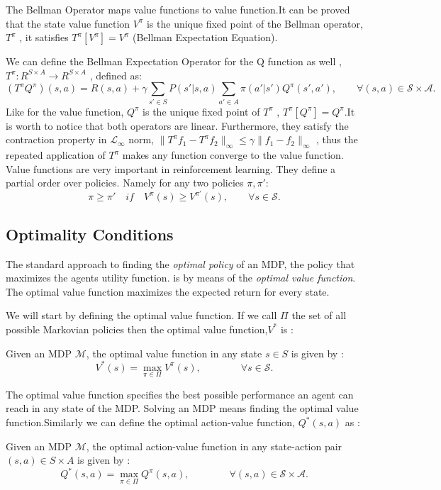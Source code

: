 The Bellman Operator maps value functions to value function.It can be proved ~\cite{Puterman:1994:MDP:528623} that the state value function $V^\pi$ is the unique fixed point of the Bellman operator, $T^\pi$ , \ie it satisfies $T^\pi[V^\pi] = V^\pi $ (Bellman Expectation Equation).\par
We can define the Bellman Expectation Operator for the Q function as well ,$T^\pi : R^{S \times A} \rightarrow
R^{S \times A}$ , defined as:
\begin{equation}
(T^\pi Q^\pi)(s,a)=R(s,a)+ \gamma \sum_{s'\in S} P(s'|s,a) \sum_{a'\in A} \pi(a'|s') Q^\pi(s',a'),  \qquad \forall (s,a) \in \mathcal{S} \times \mathcal{A}.
\end{equation}
Like for the value function, $Q^\pi$ is the unique fixed point of $T^\pi$ , \ie $T^\pi[Q^\pi] = Q^\pi$.It is worth to notice that both operators are linear. Furthermore, they satisfy the contraction property in $\mathcal{L}_\infty$ norm, \ie $ \| T^\pi f_1 − T^\pi f_2 \| _{\infty} \leq \gamma \| f_1 − f_2 \| _{\infty}$ , thus the repeated application of $T^\pi$ makes any function converge to the value function.
Value functions are very important in reinforcement learning. They define a partial order over policies. Namely for any two policies $\pi, \pi'$:
\begin{equation*}
	\pi \geq \pi'\quad if \quad V^\pi(s) \geq V^{\pi'}(s), \qquad \forall s \in \mathcal{S}.
\end{equation*}
\subsection{Optimality Conditions}
The standard approach to finding the \emph{optimal policy} of an MDP, \ie the policy that maximizes the agents utility function. is by means of the \emph{optimal value function}. The optimal value function maximizes the expected return for every state.\par
We will start by defining the optimal value function. If we call $\Pi$ the set of all possible Markovian policies then the optimal value function,$V^*$ is :
\begin{definition}
	Given an MDP $\mathcal{M}$, the optimal value function in any state $s \in S$ is given by :
\begin{equation}
	V^*(s)=\max_{\pi \in \Pi} V^\pi(s), \qquad \qquad \forall s \in \mathcal{S}.
\end{equation}
\end{definition}
The optimal value function specifies the best possible performance an agent can reach in any state of the MDP. Solving an MDP means finding the optimal value function.Similarly we can define the optimal action-value function, $Q^*(s,a)$ as :
\begin{definition}
	Given an MDP $\mathcal{M}$, the optimal action-value function in any state-action pair $(s,a) \in S \times A$ is given by :
\begin{equation}
	Q^*(s,a)=\max_{\pi \in \Pi} Q^\pi(s,a), \qquad \qquad \forall (s,a) \in \mathcal{S} \times \mathcal{A}.
\end{equation}
\end{definition}

